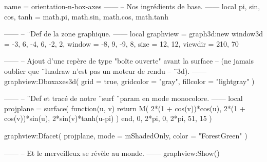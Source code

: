 \documentclass{standalone}
\begin{document}
\begin{luadraw}{name = orientation-n-box-axes}
------
-- Nos ingrédients de base.
------
local pi, sin, cos, tanh = math.pi, math.sin, math.cos, math.tanh

------
-- ¨Def de la zone graphique.
------
local graphview = graph3d:new{
  window3d = {-3, 6, -4, 6, -2, 2},
  window   = {-8, 9, -9, 8},
  size     = {12, 12},
  viewdir  = {210, 70}
}

------
-- Ajout d'une repère de type "boîte ouverte" avant la surface
-- (ne jamais oublier que ¨luadraw n'est pas un moteur de rendu
-- ¨3d).
------
graphview:Dboxaxes3d({
  grid      = true,
  gridcolor = "gray",
  fillcolor = "lightgray"
})

------
-- ¨Def et tracé de notre ¨surf ¨param en mode monocolore.
------
local projplane = surface(
  function(u, v)
    return M(
      2*(1 + cos(v))*cos(u),
      2*(1 + cos(v))*sin(u),
      2*sin(v)*tanh(u-pi)
    )
  end,
  0, 2*pi, 0, 2*pi,
  {51, 15}
)

graphview:Dfacet(
  projplane,
  {
    mode  = mShadedOnly,
    color = "ForestGreen"
  }
)

------
-- Et le merveilleux se révèle au monde.
------
graphview:Show()
\end{luadraw}
\end{document}
